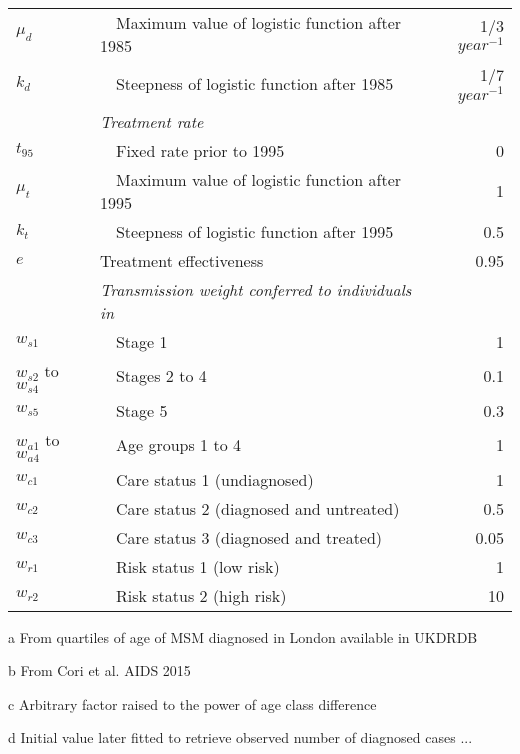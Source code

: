 \begin{threeparttable}
\begin{tabular}{llr}
$	\mu_d	$	&	~~Maximum value of logistic function after 1985  \tnote{d}	&	1/3 $year^{-1}$	\\
$	k_d	$	&	~~Steepness of logistic function after 1985  \tnote{d}	&	1/7 $year^{-1}$	\\
			&	\emph{Treatment rate}	&		\\
$	t_{95}	$	&	~~Fixed rate prior to 1995	&	0	\\
$	\mu_t	$	&	~~Maximum value of logistic function after 1995	&	1	\\
$	k_t	$	&	~~Steepness of logistic function after 1995	&	0.5	\\
$	e	$	&	Treatment effectiveness	&	0.95	\\
			&	\emph{Transmission weight conferred to individuals in}	&		\\
$	w_{s1}	$	&	~~Stage 1	&	1	\\
$	w_{s2}$ to $w_{s4}	$	&	~~Stages 2 to 4	&	0.1	\\
$	w_{s5}	$	&	~~Stage 5	&	0.3	\\
$	w_{a1}$ to $w_{a4}	$	&	~~Age groups 1 to 4	&	1	\\
$	w_{c1}	$	&	~~Care status 1 (undiagnosed)	&	1	\\
$	w_{c2}	$	&	~~Care status 2 (diagnosed and untreated)	&	0.5	\\
$	w_{c3}	$	&	~~Care status 3 (diagnosed and treated)	&	0.05	\\
$	w_{r1}	$	&	~~Risk status 1 (low risk)	&	1	\\
$	w_{r2}	$	&	~~Risk status 2 (high risk)	&	10	\\
	\bottomrule						
	\end{tabular}						
	\begin{tablenotes}						
	\item[a] From quartiles of age of MSM diagnosed in London available in UKDRDB						
	\item[b] From Cori et al. AIDS 2015						
	\item[c] Arbitrary factor raised to the power of age class difference						
	\item[d] Initial value later fitted to retrieve observed number of diagnosed cases ...						
	\end{tablenotes}						
	\end{threeparttable}						